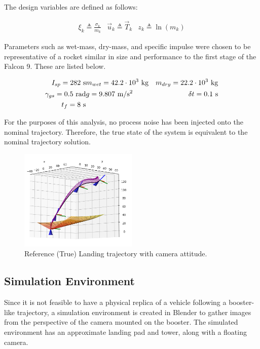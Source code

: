 \documentclass[conference]{IEEEtran}
\begin{document}
The design variables are defined as follows:

\begin{eqnarray*}
    \xi_k \triangleq \frac{\sigma_k}{m_k} & \vec{u}_k \triangleq \vec{T}_k & z_k \triangleq \ln{(m_k)}
\end{eqnarray*}

Parameters such as wet-mass, dry-mass, and specific impulse were chosen to be representative of a rocket similar in size and performance to the first stage of the Falcon 9.
These are listed below.

\begin{eqnarray*}
    I_{sp} = 282 \text{ s} & m_{wet} = 42.2 \cdot 10^3 \text{ kg} & m_{dry} = 22.2 \cdot 10^3 \text{ kg} \\
    \gamma_{gs} = 0.5 \text{ rad} & g = 9.807 \text{ m/s\textsuperscript{2}} & \delta t = 0.1 \text{ s} \\
    t_f = 8 \text{ s}
\end{eqnarray*}

For the purposes of this analysis, no process noise has been injected onto the nominal trajectory. Therefore, the true state of the system is equivalent to the nominal trajectory solution. 

\begin{figure}
    \centering
    \includegraphics[width=0.5\textwidth]{rocket_traj.png}
    \caption{Reference (True) Landing trajectory with camera attitude.}
    \label{fig:enter-label}
\end{figure}


\subsection{Simulation Environment}
Since it is not feasible to have a physical replica of a vehicle following a booster-like trajectory, a simulation environment is created in Blender to gather images from the perspective of the camera mounted on the booster. The simulated environment has an approximate landing pad and tower, along with a floating camera.
\end{document}
